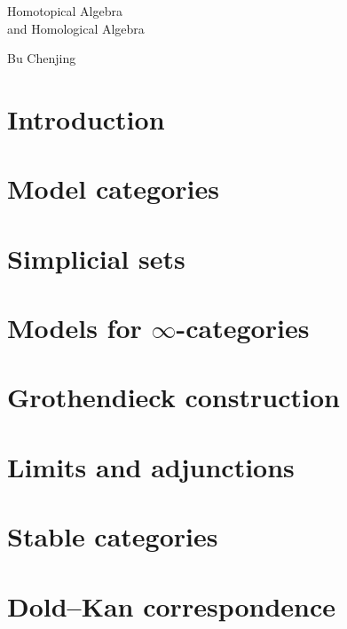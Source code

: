 \documentclass{article}
\begin{document}
\noindent
{\LARGE Homotopical Algebra\\[3pt]and Homological Algebra}
\vspace{20pt}

\noindent
Bu Chenjing
\vspace{40pt}

\section{Introduction}



\section{Model categories}



\section{Simplicial sets}



\section{Models for \texorpdfstring{$\infty$}{∞}-categories}



\section{Grothendieck construction}



\section{Limits and adjunctions}



\section{Stable categories}

\nyw

\section{Dold--Kan correspondence}

\nyw


\end{document}

